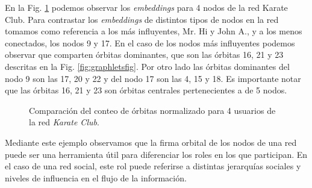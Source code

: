 En la Fig. \ref{fig:karateorbits} podemos observar los \textit{embeddings} para 4 nodos de la red Karate Club. Para contrastar los \textit{embeddings} de distintos tipos de nodos en la red tomamos como referencia a los más influyentes, Mr. Hi y John A., y a los menos conectados, los nodos 9 y 17. En el caso de los nodos más influyentes podemos observar que comparten órbitas dominantes, que son las órbitas 16, 21 y 23 descritas en la Fig. \ref{fig:graphletsfig}. Por otro lado las órbitas dominantes del nodo 9 son las 17, 20 y 22 y del nodo 17 son las 4, 15 y 18. Es importante notar que las órbitas 16, 21 y 23 son órbitas centrales pertenecientes a \graphlets de 5 nodos.

 \begin{figure}[htbp]
   \centering
   
    \caption{Comparación del conteo de órbitas normalizado para 4 usuarios de la red \textit{Karate Club}.}
    \label{fig:karateorbits}
\end{figure}

Mediante este ejemplo observamos que la firma orbital de los nodos de una red puede ser una herramienta útil para diferenciar los roles en los que participan. En el caso de una red social, este rol puede referirse a distintas jerarquías sociales y niveles de influencia en el flujo de la información.
